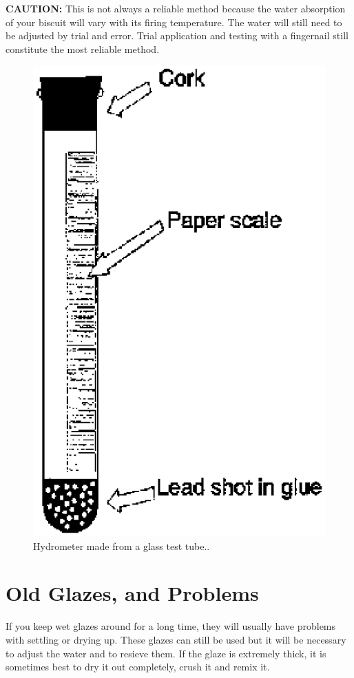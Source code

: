 \textbf{CAUTION:} This is not always a reliable method because the water 
absorption of your biscuit will vary with its firing temperature. The water 
will still need to be adjusted by trial and error. Trial application and 
testing with a fingernail still constitute the most reliable method.
\begin{figure}[htbp!]
  \centering
  \includegraphics[width=0.8\linewidth]{img/Hydrometer.eps}
  \caption{Hydrometer made from a glass test tube..}
  \label{fig:Hydrometer}
\end{figure}
\section{Old Glazes, and Problems}
If you keep wet glazes around for a long time, they will usually have problems 
with settling or drying up. These glazes can still be used but it will be 
necessary to adjust the water and to resieve them. If the glaze is extremely 
thick, it is sometimes best to dry it out completely, crush it and remix it.


